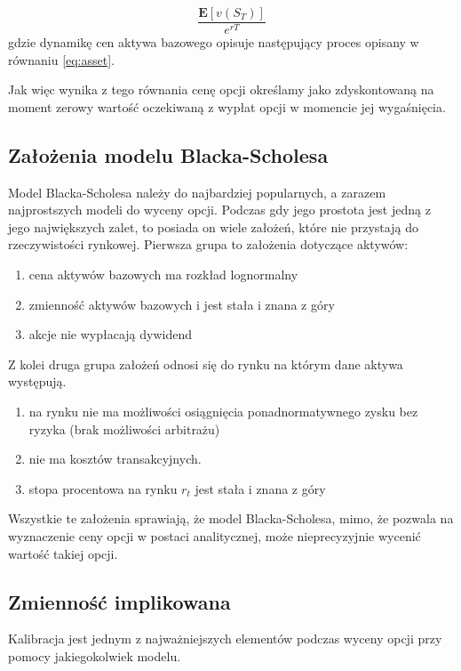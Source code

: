 \documentclass{pracamgr}
\begin{document}
\begin{equation}
\label{eq:discounting}
 \frac{\mathbf{E}[v(S_T)]}{e^{rT}}
\end{equation}
gdzie dynamikę cen aktywa bazowego opisuje następujący proces opisany w równaniu \ref{eq:asset}.

Jak więc wynika z tego równania cenę opcji określamy jako zdyskontowaną na moment zerowy wartość oczekiwaną z wypłat
opcji w momencie jej wygaśnięcia. 

\subsection{Założenia modelu Blacka-Scholesa} %
\label{sub:zalozenia_modelu_blacka_scholesa}

Model Blacka-Scholesa należy do najbardziej popularnych, a zarazem najprostszych modeli do wyceny opcji. Podczas gdy jego prostota jest jedną z jego największych zalet, to posiada on wiele założeń, które nie przystają do rzeczywistości rynkowej. Pierwsza grupa to założenia dotyczące aktywów:
\begin{enumerate}
\item cena aktywów bazowych ma rozkład lognormalny
\item zmienność aktywów bazowych i jest stała i znana z góry
\item akcje nie wypłacają dywidend
\end{enumerate}
Z kolei druga grupa założeń odnosi się do rynku na którym dane aktywa występują.
\begin{enumerate}
\item na rynku nie ma możliwości osiągnięcia ponadnormatywnego zysku bez ryzyka (brak możliwości arbitrażu)
\item nie ma kosztów transakcyjnych.
\item stopa procentowa na rynku $r_t$ jest stała i znana z góry 
\end{enumerate}

Wszystkie te założenia sprawiają, że model Blacka-Scholesa, mimo, że pozwala na wyznaczenie ceny opcji w postaci analitycznej, może nieprecyzyjnie wycenić wartość takiej opcji.
  
\subsection{Zmienność implikowana} %
\label{sub:zmienno_implikowana} 
Kalibracja jest jednym z najważniejszych elementów podczas wyceny opcji przy pomocy jakiegokolwiek modelu.  
\end{document}
